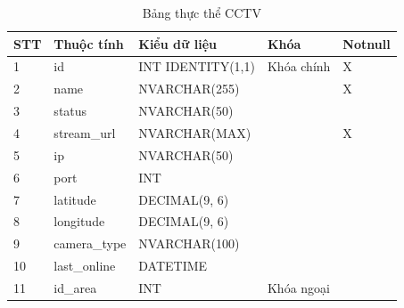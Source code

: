 \documentclass[../DoAn.tex]{subfiles}
\begin{document}
\begin{table}[H]
	\centering{}
	\begin{tabular}{m{1cm} m{4cm} m{3.5cm} m{3cm} m{1.5cm}}
		\hline
		\textbf{STT} & \textbf{Thuộc tính} & \textbf{Kiểu dữ liệu} & \textbf{Khóa} & \textbf{Notnull}
		\\ \hline
		1            & id                  & INT IDENTITY(1,1)     & Khóa chính    & X
		\\ \hline
		2            & name                & NVARCHAR(255)         &               & X
		\\ \hline
		3            & status              & NVARCHAR(50)          &               &
		\\ \hline
		4            & stream\_url         & NVARCHAR(MAX)         &               & X
		\\ \hline
		5            & ip                  & NVARCHAR(50)          &               &
		\\ \hline
		6            & port                & INT                   &               &
		\\ \hline
		7            & latitude            & DECIMAL(9, 6)         &               &
		\\ \hline
		8            & longitude           & DECIMAL(9, 6)         &               &
		\\ \hline
		9            & camera\_type        & NVARCHAR(100)         &               &
		\\ \hline
		10           & last\_online        & DATETIME              &               &
		\\ \hline
		11           & id\_area            & INT                   & Khóa ngoại    &
		\\ \hline
	\end{tabular}
	\caption{Bảng thực thể CCTV}
\end{table}
\end{document}
